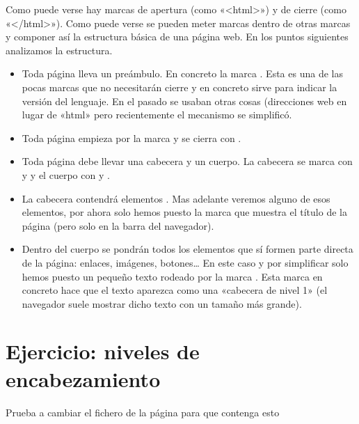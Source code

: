 \documentclass[a4paper,12pt,spanish]{sphinxmanual}
\begin{document}
Como puede verse hay marcas de apertura (como «\textless{}html\textgreater{}») y de cierre (como «\textless{}/html\textgreater{}»). Como puede verse se pueden meter marcas dentro de otras marcas y componer así la estructura básica de una página web. En los puntos siguientes analizamos la estructura.
\begin{itemize}
\item {} 
Toda página lleva un preámbulo. En concreto la marca . Esta es una de las pocas marcas que no necesitarán cierre y en concreto sirve para indicar la versión del lenguaje. En el pasado se usaban otras cosas (direcciones web en lugar de «html» pero recientemente el mecanismo se simplificó.

\item {} 
Toda página empieza por la marca  y se cierra con .

\item {} 
Toda página debe llevar una cabecera y un cuerpo. La cabecera se marca con  y  y el cuerpo con  y .

\item {} 
La cabecera contendrá elementos . Mas adelante veremos alguno de esos elementos, por ahora solo hemos puesto la marca  que muestra el título de la página (pero solo en la barra del navegador).

\item {} 
Dentro del cuerpo se pondrán todos los elementos que sí formen parte directa de la página: enlaces, imágenes, botones… En este caso y por simplificar solo hemos puesto un pequeño texto rodeado por la marca . Esta marca en concreto hace que el texto aparezca como una «cabecera de nivel 1» (el navegador suele mostrar dicho texto con un tamaño más grande).

\end{itemize}


\section{Ejercicio: niveles de encabezamiento}
\label{\detokenize{index:ejercicio-niveles-de-encabezamiento}}
Prueba a cambiar el fichero de la página para que contenga esto
\end{document}
